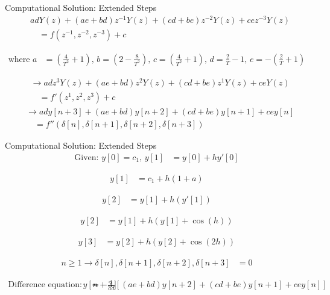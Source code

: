 \documentclass{beamer}
\begin{document}
	\begin{frame}{Computational Solution: Extended Steps}
		\begin{align}
			&adY(z) + (ae+bd)z^{-1}Y(z) + (cd+be)z^{-2}Y(z) + ce z^{-3}Y(z) \nonumber \\
			&\quad = f(z^{-1}, z^{-2}, z^{-3}) + c
		\end{align}
		
		\begin{align}
			\text{where } 
			a &= \left(\frac{4}{T^2}+1\right), \, 
			b = \left(2-\frac{8}{T^2}\right), \, 
			c = \left(\frac{4}{T^2}+1\right), \, \nonumber 
			d = \frac{2}{T}-1, \, 
			e = -\left(\frac{2}{T}+1\right)
		\end{align}
		
		\begin{align}
			&\rightarrow 
			adz^{3}Y(z) + (ae+bd)z^{2}Y(z) + (cd+be)z^{1}Y(z) + ceY(z) \nonumber \\
			&\quad = f'(z^{1}, z^{2}, z^{3}) + c
		\end{align}
		\begin{align}
			&\rightarrow 
			ady[n+3] + (ae+bd)y[n+2] + (cd+be)y[n+1] + cey[n] \nonumber \\
			&\quad = f''(\delta[n], \delta[n+1], \delta[n+2], \delta[n+3])
		\end{align}
	\end{frame}
	\begin{frame}{Computational Solution: Extended Steps}
		\begin{align}
			\text{Given: } y[0] = c_{1}, \, y[1] &= y[0] + h y'[0]
		\end{align}
		
		\begin{align}
			y[1] &= c_{1} + h(1+a)
		\end{align}
		
		\begin{align}
			y[2] &= y[1] + h(y'[1])
		\end{align}
		
		\begin{align}
			y[2] &= y[1] + h(y[1] + \cos(h))
		\end{align}
		
		\begin{align}
			y[3] &= y[2] + h(y[2] + \cos(2h))
		\end{align}
		
		\begin{align}
			n \geq 1 \rightarrow \delta[n], \delta[n+1], \delta[n+2], \delta[n+3] &= 0
		\end{align}
		
		\begin{align}
			\text{Difference equation: } 
			y[n+3] &= -\frac{1}{ad} \left[(ae+bd)y[n+2] + (cd+be)y[n+1] + cey[n]\right]
		\end{align}
	\end{frame}
\end{document}
